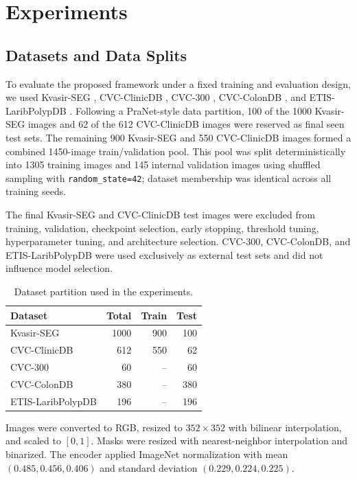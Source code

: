 \section{Experiments}\label{experiments}

\subsection{Datasets and Data Splits}\label{dataset}

To evaluate the proposed framework under a fixed training and evaluation design, we
used Kvasir-SEG \cite{kvasirseg}, CVC-ClinicDB \cite{cvcclinicdb},
CVC-300 \cite{cvc300}, CVC-ColonDB \cite{cvccolondb}, and
ETIS-LaribPolypDB \cite{etis}. Following a PraNet-style data partition,
100 of the 1000 Kvasir-SEG images and 62 of the 612 CVC-ClinicDB images
were reserved as final seen test sets. The remaining 900 Kvasir-SEG and
550 CVC-ClinicDB images formed a combined 1450-image train/validation pool.
This pool was split deterministically into 1305 training images and 145 internal
validation images using shuffled sampling with \texttt{random\_state=42}; dataset
membership was identical across all training seeds.

The final Kvasir-SEG and CVC-ClinicDB test images were excluded from training,
validation, checkpoint selection, early stopping, threshold tuning, hyperparameter
tuning, and architecture selection. CVC-300, CVC-ColonDB, and
ETIS-LaribPolypDB were used exclusively as external test sets and did not influence
model selection.

\begin{table}[htbp]
\centering
\caption{Dataset partition used in the experiments.}
\label{tab:dataset-splits}
\small
\setlength{\tabcolsep}{4pt}
\renewcommand{\arraystretch}{1.1}
\begin{tabular}{lrrr}
\toprule
Dataset & Total & Train & Test \\
\midrule
Kvasir-SEG & 1000 & 900 & 100 \\
CVC-ClinicDB & 612 & 550 & 62 \\
CVC-300 & 60 & -- & 60 \\
CVC-ColonDB & 380 & -- & 380 \\
ETIS-LaribPolypDB & 196 & -- & 196 \\
\bottomrule
\end{tabular}
\end{table}

Images were converted to RGB, resized to $352\times352$ with bilinear
interpolation, and scaled to $[0,1]$. Masks were resized with
nearest-neighbor interpolation and binarized. The encoder applied
ImageNet normalization with mean $(0.485,0.456,0.406)$ and standard
deviation $(0.229,0.224,0.225)$.

